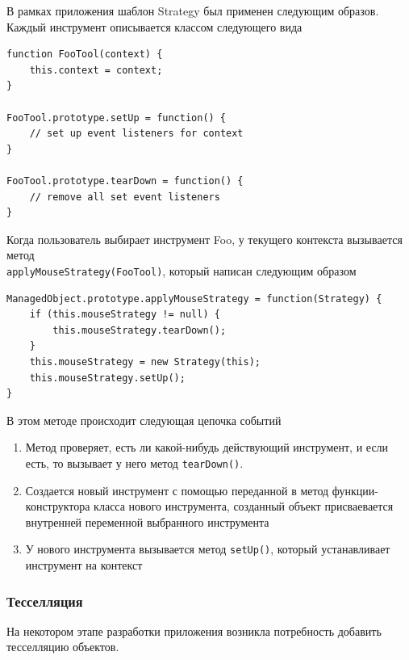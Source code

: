 \documentclass[12pt, a4paper]{article}
\begin{document}
В рамках приложения шаблон Strategy был применен следующим образов. Каждый
инструмент описывается классом следующего вида
\begin{lstlisting}
function FooTool(context) {
    this.context = context;
}

FooTool.prototype.setUp = function() {
    // set up event listeners for context
}

FooTool.prototype.tearDown = function() {
    // remove all set event listeners
}
\end{lstlisting}

Когда пользователь выбирает инструмент Foo, у текущего контекста вызывается метод \\
\texttt{applyMouseStrategy(FooTool)}, который написан следующим образом
\begin{lstlisting}
ManagedObject.prototype.applyMouseStrategy = function(Strategy) {
    if (this.mouseStrategy != null) {
        this.mouseStrategy.tearDown();
    }
    this.mouseStrategy = new Strategy(this);
    this.mouseStrategy.setUp();
}
\end{lstlisting}
В этом методе происходит следующая цепочка событий
\begin{enumerate}
    \item Метод проверяет, есть ли какой-нибудь действующий инструмент, и если
    есть, то вызывает у него метод \texttt{tearDown()}.
    \item Создается новый инструмент с помощью переданной в метод
    функции-конструктора класса нового инструмента, созданный объект
    присваевается внутренней переменной выбранного инструмента
    \item У нового инструмента вызывается метод \texttt{setUp()}, который
    устанавливает инструмент на контекст
\end{enumerate}

\subsubsection{Тесселляция}
На некотором этапе разработки приложения возникла потребность добавить
тесселляцию объектов.
\end{document}
